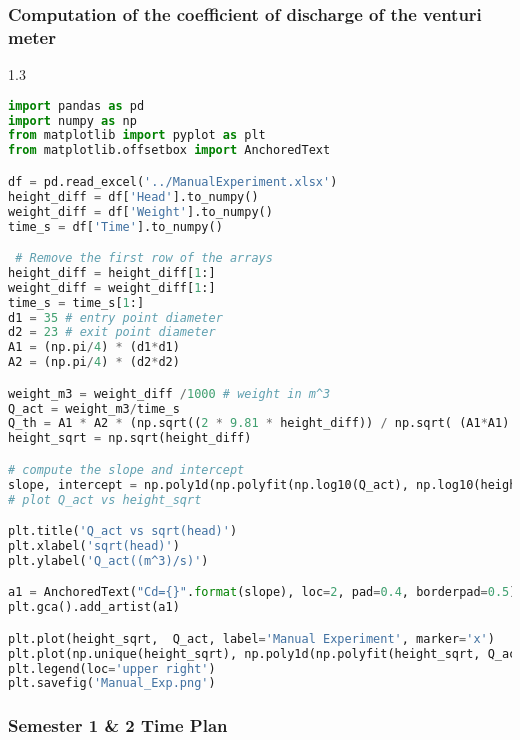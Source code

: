 \subsubsection{Computation of the coefficient of discharge of the venturi meter}

\begin{spacing}{1.3}
\begin{lstlisting}[language=Python, caption=$c_d$ computations]
import pandas as pd
import numpy as np
from matplotlib import pyplot as plt
from matplotlib.offsetbox import AnchoredText

df = pd.read_excel('../ManualExperiment.xlsx')
height_diff = df['Head'].to_numpy()
weight_diff = df['Weight'].to_numpy()
time_s = df['Time'].to_numpy()

 # Remove the first row of the arrays
height_diff = height_diff[1:]
weight_diff = weight_diff[1:]
time_s = time_s[1:]
d1 = 35 # entry point diameter
d2 = 23 # exit point diameter
A1 = (np.pi/4) * (d1*d1)
A2 = (np.pi/4) * (d2*d2)

weight_m3 = weight_diff /1000 # weight in m^3
Q_act = weight_m3/time_s
Q_th = A1 * A2 * (np.sqrt((2 * 9.81 * height_diff)) / np.sqrt( (A1*A1) * (A2 * A2)))
height_sqrt = np.sqrt(height_diff)

# compute the slope and intercept
slope, intercept = np.poly1d(np.polyfit(np.log10(Q_act), np.log10(height_sqrt), 1))
# plot Q_act vs height_sqrt

plt.title('Q_act vs sqrt(head)')
plt.xlabel('sqrt(head)')
plt.ylabel('Q_act((m^3)/s)')

a1 = AnchoredText("Cd={}".format(slope), loc=2, pad=0.4, borderpad=0.5)
plt.gca().add_artist(a1)

plt.plot(height_sqrt,  Q_act, label='Manual Experiment', marker='x')
plt.plot(np.unique(height_sqrt), np.poly1d(np.polyfit(height_sqrt, Q_act, 1))(np.unique(height_sqrt)), label='Line of best fit')
plt.legend(loc='upper right')
plt.savefig('Manual_Exp.png')
\end{lstlisting}
\end{spacing}


\subsubsection{Semester 1 \& 2 Time Plan}

